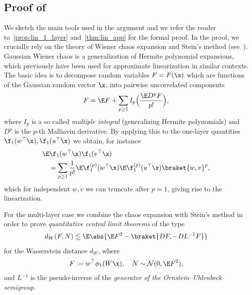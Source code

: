 \subsection{Proof of~}
    We sketch the main tools used in the argument and we refer the reader to~\cref{prop:lin_1_layer} and~\cref{thm:lin_app} for the formal proof.
    In the proof, we crucially rely on the theory of Wiener chaos expansion and Stein's method (see~\cite{nourdin2012normal}). Gaussian Wiener chaos is a generalization of Hermite polynomial expansions, which previously have been used for approximate linearization \cite{Fan2020SpectraOT,schroder2023deterministic} in similar contexts. The basic idea is to decompose random variables $F=F(\x)$ which are functions of the Gaussian random vector $\x$, into pairwise uncorrelated components 
    \begin{equation}
        F = \E F + \sum_{p\ge 1} I_p\Bigl(\frac{\E D^p F}{p!}\Bigr), 
    \end{equation}
    where $I_p$ is a so called \emph{multiple integral} (generalizing Hermite polynomials) and $D^p$ is the $p$-th Malliavin derivative. By applying this to the one-layer quantities $\f_1(w^\top \x),\f_1(u^\top \x)$ we obtain, for instance 
    \begin{equation}
    \begin{aligned}
        &\E \f_1(w^{\top} \x) \f_1(v^{\top} \x) \\
        &\quad = \sum_{p \geq 1} \frac{1}{p!} \E \f_1^{(p)}(w^\top \x) \E \f_1^{(p)}(u^\top \x) \braket{w, v}^p,
    \end{aligned}
    \end{equation}
    which for independent $w,v$ we can truncate after $p=1$, giving rise to the linearization. 
    
    For the multi-layer case we combine the chaos expansion with Stein's method in order to prove \emph{quantitative central limit theorems} of the type 
    \begin{equation}
        d_W(F,N) \lesssim \E \abs{\E F^2 - \braket{DF,-DL^{-1}F}}
    \end{equation}
    for the Wasserstein distance $d_W$, where
    \begin{equation}
        F := w^\top \phi_1(W\x),\quad  N\sim \mathcal N(0,\E F^2),
    \end{equation}
    and $L^{-1}$ is the pseudo-inverse of the \emph{generator of the Ornstein–Uhlenbeck semigroup}.  
    

